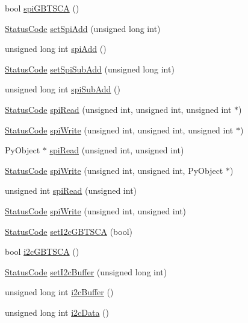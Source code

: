 \begin{DoxyCompactItemize}
\item 
bool \hyperlink{classFePGA_ad305543bda4d68fe181cd7fa614b2fe1}{spi\+G\+B\+T\+S\+CA} ()
\item 
\hyperlink{classStatusCode}{Status\+Code} \hyperlink{classFePGA_a2cd235d1971625d6742d4f3107489a07}{set\+Spi\+Add} (unsigned long int)
\item 
unsigned long int \hyperlink{classFePGA_a721de3fa12e207392cd6156027d2c776}{spi\+Add} ()
\item 
\hyperlink{classStatusCode}{Status\+Code} \hyperlink{classFePGA_ad0a662adc6070427f0e1962c20a92de6}{set\+Spi\+Sub\+Add} (unsigned long int)
\item 
unsigned long int \hyperlink{classFePGA_a6637adb1cd981cf398ea9f1c3feafe83}{spi\+Sub\+Add} ()
\item 
\hyperlink{classStatusCode}{Status\+Code} \hyperlink{classFePGA_a637b93fed75b576a54e723acb36cb6a3}{spi\+Read} (unsigned int, unsigned int, unsigned int $\ast$)
\item 
\hyperlink{classStatusCode}{Status\+Code} \hyperlink{classFePGA_ac3e8b10fc267b44fef1e651cab77d2ab}{spi\+Write} (unsigned int, unsigned int, unsigned int $\ast$)
\item 
Py\+Object $\ast$ \hyperlink{classFePGA_a41fb676237f8906ec5a0c1b9084ad33e}{spi\+Read} (unsigned int, unsigned int)
\item 
\hyperlink{classStatusCode}{Status\+Code} \hyperlink{classFePGA_aa6aebdd1ccb236f9009a29243f3c7c2b}{spi\+Write} (unsigned int, unsigned int, Py\+Object $\ast$)
\item 
unsigned int \hyperlink{classFePGA_a165f5b70ad30af106ecf9a3ace71d4eb}{spi\+Read} (unsigned int)
\item 
\hyperlink{classStatusCode}{Status\+Code} \hyperlink{classFePGA_ab41df6b1d6a147fbf5611e54058f902d}{spi\+Write} (unsigned int, unsigned int)
\item 
\hyperlink{classStatusCode}{Status\+Code} \hyperlink{classFePGA_ac9a16de5f01fda901494abe61efb5029}{set\+I2c\+G\+B\+T\+S\+CA} (bool)
\item 
bool \hyperlink{classFePGA_a210cf57766c4f818ea61af671e91cfeb}{i2c\+G\+B\+T\+S\+CA} ()
\item 
\hyperlink{classStatusCode}{Status\+Code} \hyperlink{classFePGA_aaf52ed549f6b79d53f49c3f85c5fbad2}{set\+I2c\+Buffer} (unsigned long int)
\item 
unsigned long int \hyperlink{classFePGA_a5577463c8478cb6d54fc3c75b26cd819}{i2c\+Buffer} ()
\item 
unsigned long int \hyperlink{classFePGA_a9c261a09d323c07ec4b9e925d4dfc353}{i2c\+Data} ()

\end{DoxyCompactItemize}
